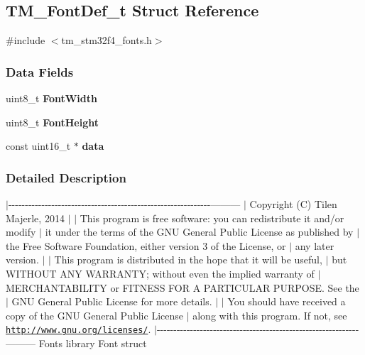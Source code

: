\hypertarget{struct_t_m___font_def__t}{}\subsection{T\+M\+\_\+\+Font\+Def\+\_\+t Struct Reference}
\label{struct_t_m___font_def__t}


{\ttfamily \#include $<$tm\+\_\+stm32f4\+\_\+fonts.\+h$>$}

\subsubsection*{Data Fields}
\begin{DoxyCompactItemize}
\item 
\hypertarget{struct_t_m___font_def__t_a021249d2eb1fb7335050c2e883335f5b}{}uint8\+\_\+t {\bfseries Font\+Width}\label{struct_t_m___font_def__t_a021249d2eb1fb7335050c2e883335f5b}

\item 
\hypertarget{struct_t_m___font_def__t_a62f376116f9d475e50cf9f8c73b7d5c4}{}uint8\+\_\+t {\bfseries Font\+Height}\label{struct_t_m___font_def__t_a62f376116f9d475e50cf9f8c73b7d5c4}

\item 
\hypertarget{struct_t_m___font_def__t_a83a3ec7b6a8a7512fe92002a4663ccc4}{}const uint16\+\_\+t $\ast$ {\bfseries data}\label{struct_t_m___font_def__t_a83a3ec7b6a8a7512fe92002a4663ccc4}

\end{DoxyCompactItemize}


\subsubsection{Detailed Description}
$\vert$-\/-\/-\/-\/-\/-\/-\/-\/-\/-\/-\/-\/-\/-\/-\/-\/-\/-\/-\/-\/-\/-\/-\/-\/-\/-\/-\/-\/-\/-\/-\/-\/-\/-\/-\/-\/-\/-\/-\/-\/-\/-\/-\/-\/-\/-\/-\/-\/-\/-\/-\/-\/-\/-\/-\/-\/-\/-\/-\/-\/-\/--------- $\vert$ Copyright (C) Tilen Majerle, 2014 $\vert$ $\vert$ This program is free software\+: you can redistribute it and/or modify $\vert$ it under the terms of the G\+N\+U General Public License as published by $\vert$ the Free Software Foundation, either version 3 of the License, or $\vert$ any later version. $\vert$ $\vert$ This program is distributed in the hope that it will be useful, $\vert$ but W\+I\+T\+H\+O\+U\+T A\+N\+Y W\+A\+R\+R\+A\+N\+T\+Y; without even the implied warranty of $\vert$ M\+E\+R\+C\+H\+A\+N\+T\+A\+B\+I\+L\+I\+T\+Y or F\+I\+T\+N\+E\+S\+S F\+O\+R A P\+A\+R\+T\+I\+C\+U\+L\+A\+R P\+U\+R\+P\+O\+S\+E. See the $\vert$ G\+N\+U General Public License for more details. $\vert$ $\vert$ You should have received a copy of the G\+N\+U General Public License $\vert$ along with this program. If not, see \href{http://www.gnu.org/licenses/}{\tt http\+://www.\+gnu.\+org/licenses/}. $\vert$-\/-\/-\/-\/-\/-\/-\/-\/-\/-\/-\/-\/-\/-\/-\/-\/-\/-\/-\/-\/-\/-\/-\/-\/-\/-\/-\/-\/-\/-\/-\/-\/-\/-\/-\/-\/-\/-\/-\/-\/-\/-\/-\/-\/-\/-\/-\/-\/-\/-\/-\/-\/-\/-\/-\/-\/-\/-\/-\/-\/-\/--------- Fonts library Font struct 